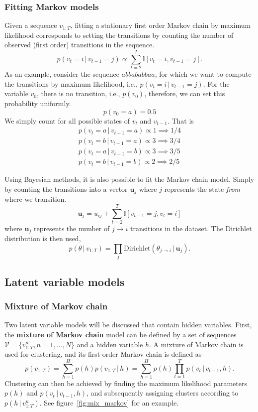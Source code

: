 \documentclass{article}
\newcommand{\giv}{\,|\,}
\begin{document}
\subsubsection{Fitting Markov models}

Given a sequence $v_{1:T}$, fitting a stationary first order Markov chain by maximum likelihood corresponds to setting the transitions by counting the number of observed (first order) transitions in the sequence. 
$$
    p(v_t = i \giv v_{t-1} = j) \propto \sum_{t=2}^T \mathbb{I}[v_t=i, v_{t-1} = j].
$$
\noindent As an example, consider the sequence $abbababbaa$, for which we want to compute the transitions by maximum likelihood, i.e., $p(v_t = i \giv v_{t-1} = j)$. For the variable $v_0$, there is no transition, i.e., $p(v_0)$, therefore, we can set this probability uniformly. 
$$
    p(v_0 = a) = 0.5
$$
\noindent We simply count for all possible states of $v_t$ and $v_{t-1}$. That is 
\begin{align*}
    p(v_t = a \giv v_{t-1} = a) \propto 1 \implies 1/4\\
    p(v_t = b \giv v_{t-1} = a) \propto 3 \implies 3/4\\
    p(v_t = a \giv v_{t-1} = b) \propto 3 \implies 3/5\\
    p(v_t = b \giv v_{t-1} = b) \propto 2 \implies 2/5
\end{align*}

\noindent Using Bayesian methods, it is also possible to fit the Markov chain model. Simply by counting the transitions into a vector $\mathbf{u}_j$ where $j$ represents the state \textit{from} where we transition. 
$$
    \mathbf{u}_j = u_{ij} + \sum_{t=2}^T \mathbb{I}[v_{t-1} = j, v_t = i]
$$
\noindent where $\mathbf{u}_j$ represents the number of $j \rightarrow i$ transitions in the dataset. The Dirichlet distribution is then used, 
$$
    p(\theta \giv v_{1:T}) = \prod_j \text{Dirichlet}(\theta_{j \rightarrow i} \giv \mathbf{u}_j).
$$

\subsection{Latent variable models}

\subsubsection{Mixture of Markov chain}

Two latent variable models will be discussed that contain hidden variables. First, the \textbf{mixture of Markov chain} model can be defined by a set of sequences $\mathcal{V} = \{v_{1:T}^n, n=1, \dots, N\}$ and a hidden variable $h$. A mixture of Markov chain is used for clustering, and its first-order Markov chain is defined as
$$
    p(v_{1:T}) = \sum_{h=1}^H p(h)p(v_{1:T} \giv h) = \sum_{h=1}^H p(h) \prod_{t=1}^T p(v_t \giv v_{t-1}, h).
$$
\noindent Clustering can then be achieved by finding the maximum likelihood parameters $p(h)$ and $p(v_t \giv v_{t-1}, h)$, and subsequently assigning clusters according to $p(h \giv v_{1:T}^n)$. See figure~\ref{fig:mix_markov} for an example.
\end{document}
